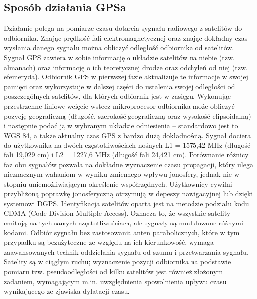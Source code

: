 \documentclass[12pt]{article}
\begin{document}
\subsection{Sposób działania GPSa}
Działanie polega na pomiarze czasu dotarcia sygnału radiowego z satelitów do odbiornika. Znając prędkość fali elektromagnetycznej oraz znając dokładny czas wysłania danego sygnału można obliczyć odległość odbiornika od satelitów. Sygnał GPS zawiera w sobie informację o układzie satelitów na niebie (tzw. almanach) oraz informację o ich teoretycznej drodze oraz odchyleń od niej (tzw. efemeryda). Odbiornik GPS w pierwszej fazie aktualizuje te informacje w swojej pamięci oraz wykorzystuje w dalszej części do ustalenia swojej odległości od poszczególnych satelitów, dla których odbiornik jest w zasięgu. Wykonując przestrzenne liniowe wcięcie wstecz mikroprocesor odbiornika może obliczyć pozycję geograficzną (długość, szerokość geograficzną oraz wysokość elipsoidalną) i następnie podać ją w wybranym układzie odniesienia – standardowo jest to WGS 84, a także aktualny czas GPS z bardzo dużą dokładnością.
Sygnał dociera do użytkownika na dwóch częstotliwościach nośnych L1 = 1575,42 MHz (długość fali 19,029 cm) i L2 = 1227,6 MHz (długość fali 24,421 cm). Porównanie różnicy faz obu sygnałów pozwala na dokładne wyznaczenie czasu propagacji, który ulega nieznacznym wahaniom w wyniku zmiennego wpływu jonosfery, jednak nie w stopniu uniemożliwiającym określenie współrzędnych. Użytkownicy cywilni przybliżoną poprawkę jonosferyczną otrzymują w depeszy nawigacyjnej lub dzięki systemowi DGPS.
Identyfikacja satelitów oparta jest na metodzie podziału kodu CDMA (Code Division Multiple Access). Oznacza to, że wszystkie satelity emitują na tych samych częstotliwościach, ale sygnały są modulowane różnymi kodami.
Odbiór sygnału bez zastosowania anten parabolicznych, które w tym przypadku są bezużyteczne ze względu na ich kierunkowość, wymaga zaawansowanych technik oddzielania sygnału od szumu i przetwarzania sygnału. Satelity są w ciągłym ruchu; wyznaczenie pozycji odbiornika na podstawie pomiaru tzw. pseudoodległości od kilku satelitów jest również złożonym zadaniem, wymagającym m.in. uwzględnienia spowolnienia upływu czasu wynikającego ze zjawiska dylatacji czasu.
\end{document}

